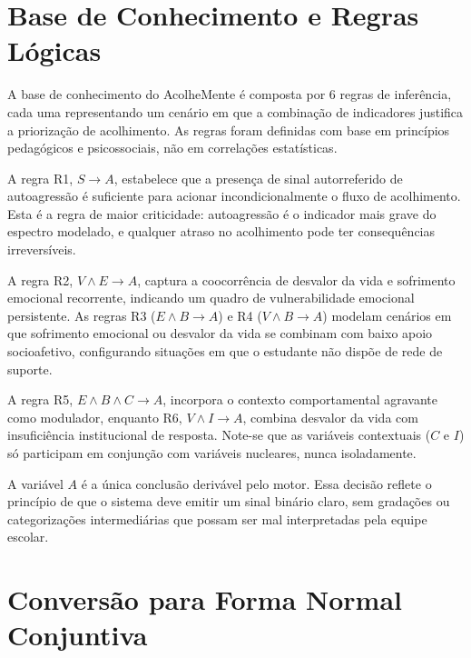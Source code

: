 \documentclass[
    12pt,
    openright,
    oneside,
    a4paper,
    english,
    brazil
]{abntex2}
\begin{document}
\chapter{Base de Conhecimento e Regras Lógicas}

A base de conhecimento do AcolheMente é composta por 6 regras de inferência, cada uma representando um cenário em que a combinação de indicadores justifica a priorização de acolhimento. As regras foram definidas com base em princípios pedagógicos e psicossociais, não em correlações estatísticas.

A regra R1, $S \rightarrow A$, estabelece que a presença de sinal autorreferido de autoagressão é suficiente para acionar incondicionalmente o fluxo de acolhimento. Esta é a regra de maior criticidade: autoagressão é o indicador mais grave do espectro modelado, e qualquer atraso no acolhimento pode ter consequências irreversíveis.

A regra R2, $V \land E \rightarrow A$, captura a coocorrência de desvalor da vida e sofrimento emocional recorrente, indicando um quadro de vulnerabilidade emocional persistente. As regras R3 ($E \land B \rightarrow A$) e R4 ($V \land B \rightarrow A$) modelam cenários em que sofrimento emocional ou desvalor da vida se combinam com baixo apoio socioafetivo, configurando situações em que o estudante não dispõe de rede de suporte.

A regra R5, $E \land B \land C \rightarrow A$, incorpora o contexto comportamental agravante como modulador, enquanto R6, $V \land I \rightarrow A$, combina desvalor da vida com insuficiência institucional de resposta. Note-se que as variáveis contextuais ($C$ e $I$) só participam em conjunção com variáveis nucleares, nunca isoladamente.

A variável $A$ é a única conclusão derivável pelo motor. Essa decisão reflete o princípio de que o sistema deve emitir um sinal binário claro, sem gradações ou categorizações intermediárias que possam ser mal interpretadas pela equipe escolar.



\chapter{Conversão para Forma Normal Conjuntiva}
\end{document}
